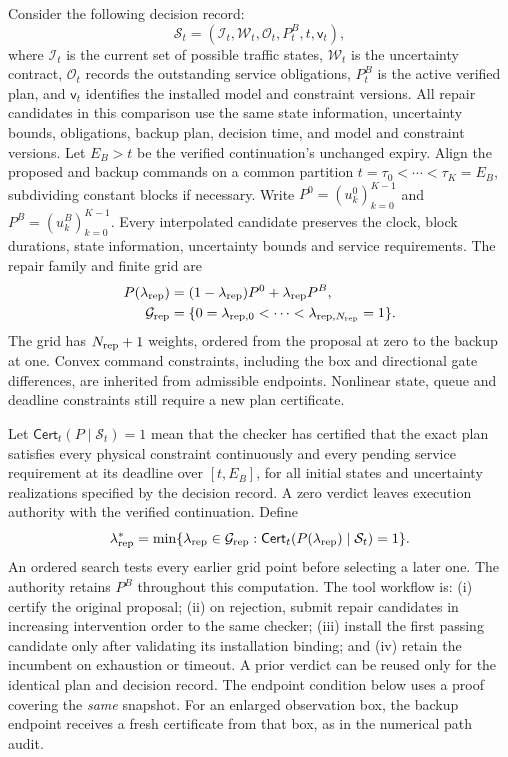 \documentclass[preprint,12pt]{elsarticle}
\begin{document}
Consider the following decision record:
\[
\mathcal S_t=(\mathcal I_t,\mathcal W_t,\mathcal O_t,P_t^B,t,\mathsf v_t),
\]
where $\mathcal I_t$ is the current set of possible traffic states,
$\mathcal W_t$ is the uncertainty contract, $\mathcal O_t$ records the
outstanding service obligations, $P_t^B$ is the active verified plan,
and $\mathsf v_t$ identifies the installed model and constraint versions.
All repair candidates in this comparison use the same state information,
uncertainty bounds, obligations, backup plan, decision time, and model and
constraint versions. Let $E_B>t$ be the verified continuation's unchanged
expiry. Align the proposed and backup commands on a common
partition $t=\tau_0<\cdots<\tau_K=E_B$, subdividing constant blocks if
necessary. Write $P^0=(u_k^0)_{k=0}^{K-1}$ and
$P^B=(u_k^B)_{k=0}^{K-1}$. Every interpolated candidate preserves the
clock, block durations, state information, uncertainty bounds and service
requirements.
The repair family and finite grid are
\begin{equation}
\begin{aligned}
P(\lambda_{\rm rep})&=(1-\lambda_{\rm rep})P^0+\lambda_{\rm rep} P^B,\\
\mathcal G_{\rm rep}&=\{0=\lambda_{{\rm rep},0}<\cdots<\lambda_{{\rm rep},N_{\rm rep}}=1\}.
\end{aligned}
\label{eq:repair-family}
\end{equation}
The grid has $N_{\rm rep}+1$ weights, ordered from the proposal at zero
to the backup at one. Convex command constraints, including the box and directional
gate differences, are inherited from admissible endpoints. Nonlinear state,
queue and deadline constraints still require a new plan certificate.

Let $\mathsf{Cert}_t(P\mid\mathcal S_t)=1$ mean that the checker has certified
that the exact plan satisfies every physical constraint continuously and
every pending service requirement at its deadline over $[t,E_B]$, for all
initial states and uncertainty realizations specified by the decision record. A zero verdict leaves execution authority with the
verified continuation. Define
\begin{equation}
\lambda_{\rm rep}^*=\min\{\lambda_{\rm rep}\in\mathcal G_{\rm rep}:
                  \mathsf{Cert}_t(P(\lambda_{\rm rep})\mid\mathcal S_t)=1\}.
\label{eq:repair-selection}
\end{equation}
An ordered search tests every earlier grid point before selecting a later
one. The authority retains $P^B$ throughout this computation. The tool workflow
is: (i) certify the original proposal; (ii) on rejection, submit repair
candidates in increasing intervention order to the same checker; (iii)
install the first passing candidate only after validating its installation
binding; and (iv) retain the incumbent on exhaustion or timeout. A prior
verdict can be reused only for the identical plan and decision record. The endpoint
condition below uses a proof covering the \emph{same} snapshot. For an
enlarged observation box, the backup endpoint receives a fresh certificate
from that box, as in the numerical path audit.
\end{document}
